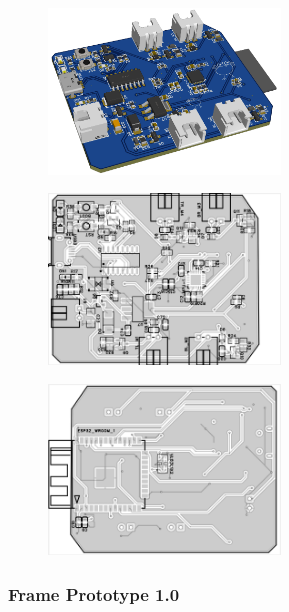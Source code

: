 \begin{figure}[H]
    \centering
    \captionsetup{justification=centering, margin=1cm}
    \includegraphics[width=0.55\textwidth]{img/proto-pcb2.png}
\end{figure}

\begin{figure}[H]
    \centering
    \captionsetup{justification=centering, margin=1cm}
    \includegraphics[width=0.55\textwidth]{img/PCBit2_front.png}
\end{figure}

\begin{figure}[H]
    \centering
    \captionsetup{justification=centering, margin=1cm}
    \includegraphics[width=0.55\textwidth]{img/PCBit2_back.png}
\end{figure}

\pagebreak
\subsubsection{Frame Prototype 1.0}


